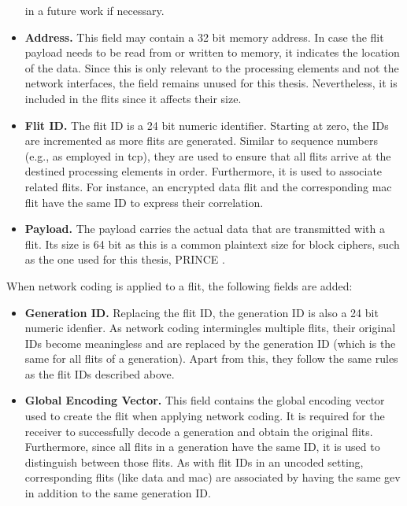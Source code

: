\begin{itemize}
        in a future work if necessary.
    \item \textbf{Address.} This field may contain a 32 bit memory address. In case the flit payload needs to be read from or written to memory, it
        indicates the location of the data. Since this is only relevant to the processing elements and not the network interfaces, the field remains
        unused for this thesis. Nevertheless, it is included in the flits since it affects their size.
    \item \textbf{Flit ID.} The flit ID is a 24 bit numeric identifier. Starting at zero, the IDs are incremented as more flits are generated.
        Similar to sequence numbers (e.g., as employed in \gls{tcp}), they are used to ensure that all flits arrive at the destined processing
        elements in order. Furthermore, it is used to associate related flits. For instance, an encrypted data flit and the corresponding \gls{mac}
        flit have the same ID to express their correlation.
    \item \textbf{Payload.} The payload carries the actual data that are transmitted with a flit. Its size is 64 bit as this is a common plaintext
        size for block ciphers, such as the one used for this thesis, PRINCE \cite{borghoff12prince}.
\end{itemize}
\vspace{0.5\baselineskip}

When network coding is applied to a flit, the following fields are added:
\begin{itemize}
    \item \textbf{Generation ID.} Replacing the flit ID, the generation ID is also a 24 bit numeric idenfier. As network coding intermingles multiple
        flits, their original IDs become meaningless and are replaced by the generation ID (which is the same for all flits of a generation). Apart
        from this, they follow the same rules as the flit IDs described above.
    \item \textbf{Global Encoding Vector.} This field contains the global encoding vector used to create the flit when applying network coding. It is
        required for the receiver to successfully decode a generation and obtain the original flits. Furthermore, since all flits in a generation have
        the same ID, it is used to distinguish between those flits. As with flit IDs in an uncoded setting, corresponding flits (like data and
        \gls{mac}) are associated by having the same \gls{gev} in addition to the same generation ID.
\end{itemize}
\vspace{0.5\baselineskip}

